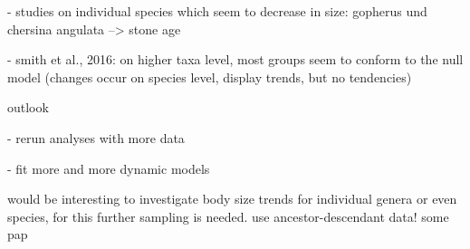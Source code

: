 - studies on individual species which seem to decrease in size: gopherus und chersina angulata --> stone age

- smith et al., 2016: on higher taxa level, most groups seem to conform to the null model (changes occur on species level, display trends, but no tendencies)


outlook

- rerun analyses with more data

- fit more and more dynamic models \citep{Hunt2015}



would be interesting to investigate body size trends for individual genera or even species, for this further sampling is needed. use ancestor-descendant data! 
some pap
